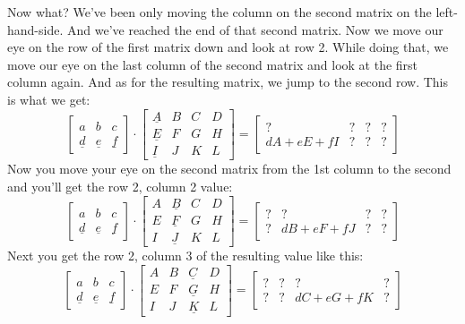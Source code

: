Now what? 
We've been only moving the column on the second matrix on the left-hand-side.
And we've reached the end of that second matrix.
Now we move our eye on the row of the first matrix down and look at row 2.
While doing that, we move our eye on the last column of the second matrix
and look at the first column again.
And as for the resulting matrix, we jump to the second row.
This is what we get:
\[
\begin{bmatrix}
a & b & c \\
\underline{d} & \underline{e} & \underline{f} 
\end{bmatrix}
\cdot
\begin{bmatrix}
\underline{A} & B & C & D \\
\underline{E} & F & G & H \\
\underline{I} & J & K & L  
\end{bmatrix}
= 
\begin{bmatrix}
? & ? & ? & ?\\
dA + eE + fI & ? & ? & ?
\end{bmatrix}
\]
Now you move your eye on the second matrix from the 1st column to the second
and you'll get the row 2, column 2 value:
\[
\begin{bmatrix}
a & b & c \\
\underline{d} & \underline{e} & \underline{f} 
\end{bmatrix}
\cdot
\begin{bmatrix}
A & \underline{B} & C & D \\
E & \underline{F} & G & H \\
I & \underline{J} & K & L  
\end{bmatrix}
= 
\begin{bmatrix}
? & ? & ? & ?\\
? & dB + eF + fJ & ? & ?
\end{bmatrix}
\]
Next you get the row 2, column 3 of the resulting value like this:
\[
\begin{bmatrix}
a & b & c \\
\underline{d} & \underline{e} & \underline{f} 
\end{bmatrix}
\cdot
\begin{bmatrix}
A & B & \underline{C} & D \\
E & F & \underline{G} & H \\
I & J & \underline{K} & L  
\end{bmatrix}
= 
\begin{bmatrix}
? & ? & ? & ?\\
? & ? & dC + eG + fK & ?
\end{bmatrix}
\]
